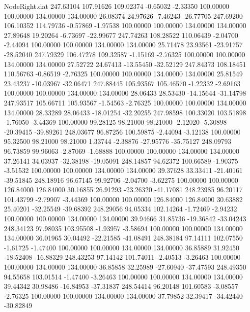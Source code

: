 \begin{filecontents}{NodeRight.dat}
 247.63104  107.91626  109.02374    -0.65032   -2.33350  100.00000  100.00000  134.00000  134.00000   26.08374   24.97626   -7.46243  -26.77705
 247.69200  106.10352  114.79736    -0.57869   -1.97538  100.00000  100.00000  134.00000  134.00000   27.89648   19.20264   -6.73697  -22.99677
 247.74263  108.28522  110.06439    -2.04700   -2.44094  100.00000  100.00000  134.00000  134.00000   25.71478   23.93561  -23.91757  -28.52040
 247.79329  106.47278  109.32587    -1.15169   -2.76325  100.00000  100.00000  134.00000  134.00000   27.52722   24.67413  -13.55450  -32.52129
 247.84373  108.18451  110.56763    -0.86519   -2.76325  100.00000  100.00000  134.00000  134.00000   25.81549   23.43237  -10.03967  -32.06471
 247.88445  105.93567  105.46570    -1.22332   -2.69163  100.00000  100.00000  134.00000  134.00000   28.06433   28.53430  -14.15644  -31.14798
 247.93517  105.66711  105.93567    -1.54563   -2.76325  100.00000  100.00000  134.00000  134.00000   28.33289   28.06433  -18.01254  -32.20255
 247.98598  100.33020  103.51898    -1.76050   -3.44369  100.00000   99.28125   98.21000   98.21000   -2.12020   -5.30898  -20.39415  -39.89261
 248.03677   96.87256  100.59875    -2.44094   -3.12138  100.00000   95.32500   98.21000   98.21000    1.33744   -2.38876  -27.95776  -35.75127
 248.09793   96.73859   99.96063    -2.87069   -1.68888  100.00000  100.00000  134.00000  134.00000   37.26141   34.03937  -32.38198  -19.05091
 248.14857   94.62372  100.66589    -1.90375   -3.51532  100.00000  100.00000  134.00000  134.00000   39.37628   33.33411  -21.40161  -39.51845
 248.18916   96.67145   99.92706    -2.04700   -3.62275  100.00000  100.00000  126.84000  126.84000   30.16855   26.91293  -23.26320  -41.17081
 248.23985   96.20117  101.43799    -2.79907   -3.44369  100.00000  100.00000  126.84000  126.84000   30.63882   25.40201  -32.25549  -39.68392
 248.29056   94.05334  102.14264    -1.72469   -2.94232  100.00000  100.00000  134.00000  134.00000   39.94666   31.85736  -19.36842  -33.04243
 248.34123   97.98035  103.95508    -1.93957   -3.58694  100.00000  100.00000  134.00000  134.00000   36.01965   30.04492  -22.21585  -41.08491
 248.38184   97.14111  102.07550    -1.61725   -1.47400  100.00000  100.00000  134.00000  134.00000   36.85889   31.92450  -18.52408  -16.88329
 248.43253   97.14142  101.74011    -2.40513   -3.26463  100.00000  100.00000  134.00000  134.00000   36.85858   32.25989  -27.60940  -37.47593
 248.49350   94.55658  103.01514    -1.47400   -3.26463  100.00000  100.00000  134.00000  134.00000   39.44342   30.98486  -16.84953  -37.31837
 248.54414   96.20148  101.60583    -3.08557   -2.76325  100.00000  100.00000  134.00000  134.00000   37.79852   32.39417  -34.42440  -30.82849

\end{filecontents}
